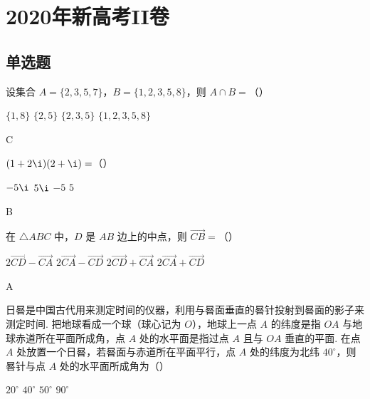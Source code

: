 \chapter{2020年新高考II卷}

\section{单选题}

\begin{problem}
设集合 \(A=\{2,3,5,7\}\)，\(B=\{1,2,3,5,8\}\)，则 \(A\cap B=\)（\quad）

\choices
    {\(\{1,8\}\)}
    {\(\{2,5\}\)}
    {\(\{2,3,5\}\)}
    {\(\{1,2,3,5,8\}\)}
\end{problem}

\begin{answer}
    C
\end{answer}

\begin{problem}
\((1+2\i)(2+\i)=\)（\quad）

\choices
    {\(-5\i\)}
    {\(5\i\)}
    {\(-5\)}
    {\(5\)}
\end{problem}

\begin{answer}
    B
\end{answer}

\begin{problem}
在 \(\triangle ABC\) 中，\(D\) 是 \(AB\) 边上的中点，则 \(\overrightarrow{CB}=\)（\quad）

\choices
    {\(2\overrightarrow{CD}-\overrightarrow{CA}\)}
    {\(2\overrightarrow{CA}-\overrightarrow{CD}\)}
    {\(2\overrightarrow{CD}+\overrightarrow{CA}\)}
    {\(2\overrightarrow{CA}+\overrightarrow{CD}\)}
\end{problem}

\begin{answer}
    A
\end{answer}

\begin{problem}
日晷是中国古代用来测定时间的仪器，利用与晷面垂直的晷针投射到晷面的影子来测定时间. 把地球看成一个球（球心记为 \(O\)），地球上一点 \(A\) 的纬度是指 \(OA\) 与地球赤道所在平面所成角，点 \(A\) 处的水平面是指过点 \(A\) 且与 \(OA\) 垂直的平面. 在点 \(A\) 处放置一个日晷，若晷面与赤道所在平面平行，点 \(A\) 处的纬度为北纬 \(40^\circ\)，则晷针与点 \(A\) 处的水平面所成角为（\quad）

\begin{center}
\end{center}

\choices
    {\(20^\circ\)}
    {\(40^\circ\)}
    {\(50^\circ\)}
    {\(90^\circ\)}
\end{problem}

